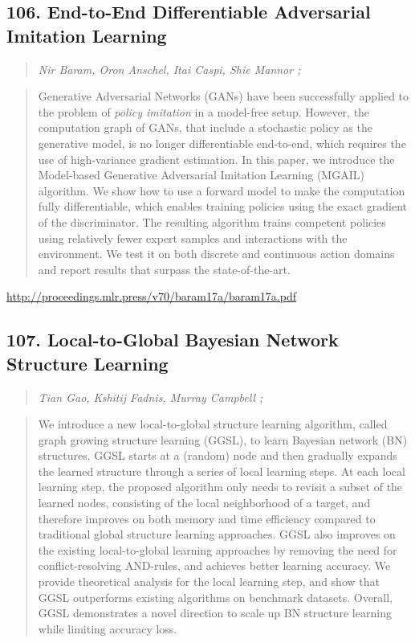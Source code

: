 \documentclass{article}
\begin{document}
\subsection{106. End-to-End Differentiable Adversarial Imitation Learning}

\begin{quote}
\footnotesize{\textit{Nir Baram, Oron Anschel, Itai Caspi, Shie Mannor ;}}
\end{quote}

\begin{quote}
    Generative Adversarial Networks (GANs) have been successfully applied to the problem of \textit{policy imitation} in a model-free setup. However, the computation graph of GANs, that include a stochastic policy as the generative model, is no longer differentiable end-to-end, which requires the use of high-variance gradient estimation. In this paper, we introduce the Model-based Generative Adversarial Imitation Learning (MGAIL) algorithm. We show how to use a forward model to make the computation fully differentiable, which enables training policies using the exact gradient of the discriminator. The resulting algorithm trains competent policies using relatively fewer expert samples and interactions with the environment. We test it on both discrete and continuous action domains and report results that surpass the state-of-the-art.  \end{quote}

\href{http://proceedings.mlr.press/v70/baram17a/baram17a.pdf}{http://proceedings.mlr.press/v70/baram17a/baram17a.pdf}

\subsection{107. Local-to-Global Bayesian Network Structure Learning}

\begin{quote}
\footnotesize{\textit{Tian Gao, Kshitij Fadnis, Murray Campbell ;}}
\end{quote}

\begin{quote}
    We introduce a new local-to-global structure learning algorithm, called graph growing structure learning (GGSL), to learn Bayesian network (BN) structures. GGSL starts at a (random) node and then gradually expands the learned structure through a series of local learning steps. At each local learning step, the proposed algorithm only needs to revisit a subset of the learned nodes, consisting of the local neighborhood of a target, and therefore improves on both memory and time efficiency compared to traditional global structure learning approaches. GGSL also improves on the existing local-to-global learning approaches by removing the need for conflict-resolving AND-rules, and achieves better learning accuracy. We provide theoretical analysis for the local learning step, and show that GGSL outperforms existing algorithms on benchmark datasets. Overall, GGSL demonstrates a novel direction to scale up BN structure learning while limiting accuracy loss.  \end{quote}
\end{document}
